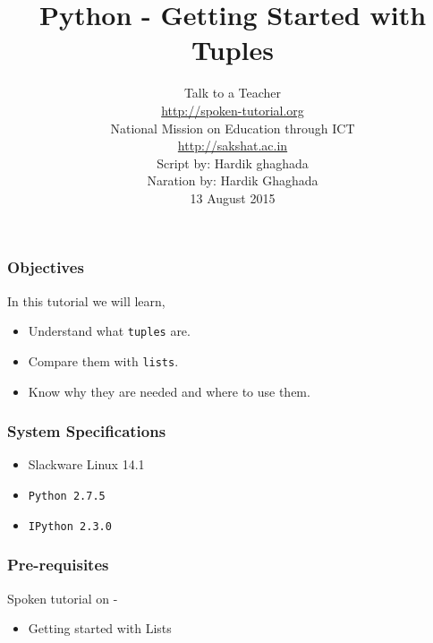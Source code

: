 \documentclass[17pt,compress]{beamer}
\author[FOSSEE]{}
\institute[IIT Bombay]{}
\date[]{}
\begin{document}
\sffamily \bfseries
\title
[Getting Started with Tuples]
{Python - Getting Started with Tuples}
\author
[FOSSEE, IIT - Bombay]
{\small Talk to a Teacher\\{\color{blue}\url{http://spoken-tutorial.org}}\\National Mission on Education
 through ICT\\{\color{blue}\url{http://sakshat.ac.in}} \\[0.5cm]{\tiny Script by: Hardik ghaghada \\ Naration by: Hardik Ghaghada \\ 13 August 2015}}

\begin{frame}
   \titlepage
\end{frame}
\begin{frame}
\frametitle{Objectives}
\label{sec-2}

  In this tutorial we will learn, \pause


\begin{itemize}
\item Understand what \texttt{tuples} are.\pause
\item Compare them with \texttt{lists}.\pause
\item Know why they are needed and where to use them.
\end{itemize}
\end{frame}
\begin{frame}
\frametitle{System Specifications}\pause
\begin{itemize}
\item Slackware Linux 14.1\pause
\item \texttt{Python 2.7.5} \pause
\item \texttt{IPython 2.3.0}
\end{itemize}
\end{frame}
\begin{frame}
\frametitle{Pre-requisites}
\label{sec-3}

Spoken tutorial on -

\begin{itemize}
\item Getting started with Lists
\end{itemize}
\end{frame}
\end{document}
